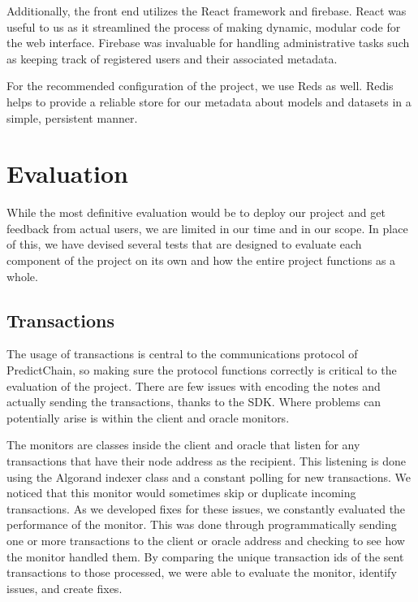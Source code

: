 \documentclass{article}
\begin{document}
    Additionally, the front end utilizes the React framework and firebase.  React was useful to us as it streamlined the process of making
    dynamic, modular code for the web interface.  Firebase was invaluable for handling administrative tasks such as keeping
    track of registered users and their associated metadata.

    For the recommended configuration of the project, we use Reds as well.  Redis helps to provide a reliable store for
    our metadata about models and datasets in a simple, persistent manner.

    \section{Evaluation}


    While the most definitive evaluation would be to deploy our project and get feedback from actual users, we are limited
    in our time and in our scope.  In place of this, we have devised several tests that are designed to evaluate each
    component of the project on its own and how the entire project functions as a whole.

    \subsection{Transactions}

    The usage of transactions is central to the communications protocol of PredictChain, so making sure the protocol
    functions correctly is critical to the evaluation of the project.  There are few issues with encoding the
    notes and actually sending the transactions, thanks to the SDK.  Where problems can potentially arise is within the
    client and oracle monitors.

    The monitors are classes inside the client and oracle that listen for any transactions that have their node address
    as the recipient.  This listening is done using the Algorand indexer class and a constant polling for new transactions.
    We noticed that this monitor would sometimes skip or duplicate incoming transactions.  As we developed fixes for
    these issues, we constantly evaluated the performance of the monitor.  This was done through programmatically sending
    one or more transactions to the client or oracle address and checking to see how the monitor handled them.  By comparing
    the unique transaction ids of the sent transactions to those processed, we were able to evaluate the monitor,
    identify issues, and create fixes.
\end{document}

